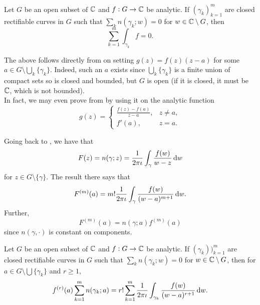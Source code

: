 		\begin{fcor}
			\label{cauchys theorem v1}
			Let $G$ be an open subset of $\mathbb{C}$ and $f : G \to \mathbb{C}$ be analytic. If $(\gamma_k)_{k=1}^m$ are closed rectifiable curves in $G$ such that $\sum_k n(\gamma_k;w) = 0$ for $w \in \mathbb{C} \setminus G$, then
			\[ \sum_{k=1}^m \int_{\gamma_k} f = 0. \]
		\end{fcor}

		The above follows directly from  on setting $g(z) = f(z) (z-a)$ for some $a \in G \setminus \bigcup_k \{\gamma_k\}$. Indeed, such an $a$ exists since $\bigcup_k \{\gamma_k\}$ is a finite union of compact sets so is closed and bounded, but $G$ is open (if it is closed, it must be $\mathbb{C}$, which is not bounded).\\
		In fact, we may even prove  from  by using it on the analytic function
		\[
			g(z) =
			\begin{cases}
				\frac{f(z)-f(a)}{z-a}, & z \ne a, \\
				f'(a), & z = a.
			\end{cases}
		\]

		Going back to , we have that
		\[ F(z) = n(\gamma;z) = \frac{1}{2\pi\iota} \int_\gamma \frac{f(w)}{w-z} \dif w \]
		for $z \in G \setminus \{\gamma\}$. The result there says that
		\[ F^{(m)}(a) = m! \frac{1}{2\pi\iota} \int_\gamma \frac{f(w)}{(w-a)^{m+1}} \dif w. \]
		Further,
		\[ F^{(m)}(a) = n(\gamma;a) f^{(m)}(a) \]
		since $n(\gamma,\cdot)$ is constant on components.

		\begin{theorem}
			Let $G$ be an open subset of $\mathbb{C}$ and $f : G \to \mathbb{C}$ be analytic. If $(\gamma_k))_{k=1}^m$ are closed rectifiable curves in $G$ such that $\sum_k n(\gamma_k;w) = 0$ for $w \in \mathbb{C} \setminus G$, then for $a \in G \setminus \bigcup \{\gamma_k\}$ and $r \ge 1$,
			\[ f^{(r)}(a) \sum_{k=1}^m n(\gamma_k;a) = r! \sum_{k=1}^m \frac{1}{2\pi\iota} \int_{\gamma_k} \frac{f(w)}{(w-a)^{r+1}} \dif w. \]
		\end{theorem}

